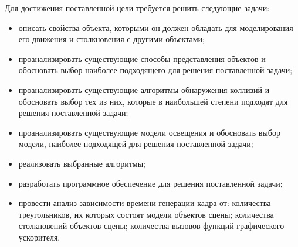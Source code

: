 Для достижения поставленной цели требуется решить следующие задачи:
\begin{itemize}
    \item описать свойства объекта, которыми он должен обладать для моделирования его движения и столкновения с другими объектами;
    \item проанализировать существующие способы представления объектов и обосновать выбор наиболее подходящего для решения поставленной задачи;
    \item проанализировать существующие алгоритмы обнаружения коллизий и обосновать выбор тех из них, которые в наибольшей степени подходят для решения поставленной задачи;
    \item проанализировать существующие модели освещения и обосновать выбор модели, наиболее подходящей для решения поставленной задачи;
    \item реализовать выбранные алгоритмы;
    \item разработать программное обеспечение для решения поставленной задачи;
    \item провести анализ зависимости времени генерации кадра от: количества треугольников, их которых состоят модели объектов сцены; количества столкновений объектов сцены; количества вызовов функций графического ускорителя.
\end{itemize}
